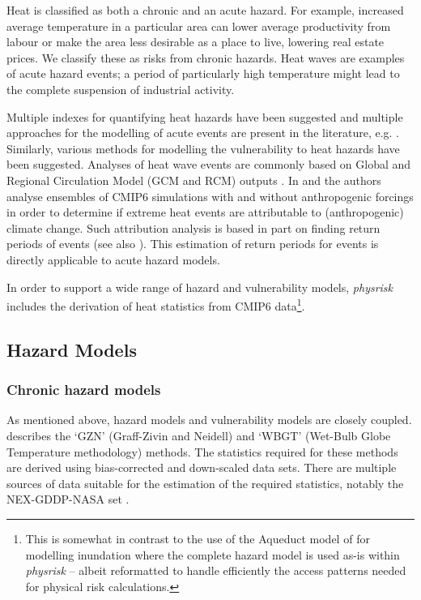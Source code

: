 \documentclass[a4paper,11pt]{extarticle} %
\theoremstyle{definition}
\begin{document}
Heat is classified as both a chronic and an acute hazard.  For example, increased average temperature in a particular area can lower average productivity from labour or make the area less desirable as a place to live, lowering real estate prices. We classify these as risks from chronic hazards. Heat waves are examples of acute hazard events; a period of particularly high temperature might lead to the complete suspension of industrial activity.

Multiple indexes for quantifying heat hazards have been suggested and multiple approaches for the modelling of acute events are present in the literature, e.g. \cite{MazdiyasniEtAl:2019}. Similarly, various methods for modelling the vulnerability to heat hazards have been suggested. Analyses of heat wave events are commonly based on Global and Regional Circulation Model (GCM and RCM) outputs \cite{DosioEtAl:2018}. In \cite{Christidis:2021} and \cite{Christidis:2013} the authors analyse ensembles of CMIP6 simulations with and without anthropogenic forcings in order to determine if extreme heat events are attributable to (anthropogenic) climate change. Such attribution analysis is based in part on finding return periods of events (see also \cite{StottEtAl:2016}). This estimation of return periods for events is directly applicable to acute hazard models.

In order to support a wide range of hazard and vulnerability models,  \emph{physrisk} includes the derivation of heat statistics from CMIP6 data\footnote{This is somewhat in contrast to the use of the Aqueduct model of \cite{WardEtAl:2020} for modelling inundation where the complete hazard model is used as-is within \emph{physrisk} -- albeit reformatted to handle efficiently the access patterns needed for physical risk calculations.}.

\subsection{Hazard Models}

\subsubsection{Chronic hazard models}
As mentioned above, hazard models and vulnerability models are closely coupled. \cite{ZhangAndShindell:2021} describes the `GZN' (Graff-Zivin and Neidell) and `WBGT' (Wet-Bulb Globe Temperature methodology) methods. The statistics required for these methods are derived using bias-corrected and down-scaled data sets. There are multiple sources of data suitable for the estimation of the required statistics, notably the NEX-GDDP-NASA set \cite{ThrasherEtAl:2022}.
\end{document}
